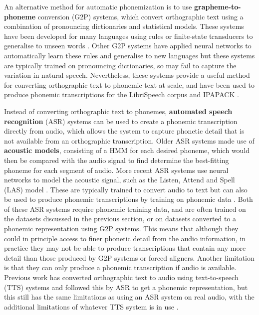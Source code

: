 An alternative method for automatic phonemization is to use \textbf{grapheme-to-phoneme} conversion (G2P) systems, which convert orthographic text using a combination of pronouncing dictionaries and statistical models. These systems have been developed for many languages using rules or finite-state transducers to generalise to unseen words \citep{Mortensen-et-al:2018, johnson2020g2p, Bernard2021}. Other G2P systems have applied neural networks to automatically learn these rules and generalise to new languages \citep{NOVAK_MINEMATSU_HIROSE_2016, Zhu2022} but these systems are typically trained on pronouncing dictionaries, so may fail to capture the variation in natural speech. Nevertheless, these systems provide a useful method for converting orthographic text to phonemic text at scale, and have been used to produce phonemic transcriptions for the LibriSpeech corpus \citep{Kahn_2020} and IPAPACK \citep{zhu-etal-2024-taste}.

Instead of converting orthographic text to phonemes, \textbf{automated speech recognition} (ASR) systems can be used to create a phonemic transcription directly from audio, which allows the system to capture phonetic detail that is not available from an orthographic transcription. Older ASR systems made use of \textbf{acoustic models}, consisting of a HMM for each desired phoneme, which would then be compared with the audio signal to find determine the best-fitting phoneme for each segment of audio. More recent ASR systems use neural networks to model the acoustic signal, such as the Listen, Attend and Spell (LAS) model \citep{chan2015listen}. These are typically trained to convert audio to text but can also be used to produce phonemic transcriptions by training on phonemic data \citep{feng-2023-language-universal-phonetic}. Both of these ASR systems require phonemic training data, and are often trained on the datasets discussed in the previous section, or on datasets converted to a phonemic representation using G2P systems. This means that although they could in principle access to finer phonetic detail from the audio information, in practice they may not be able to produce transcriptions that contain any more detail than those produced by G2P systems or forced aligners. Another limitation is that they can only produce a phonemic transcription if audio is available. Previous work has converted orthographic text to audio using text-to-speech (TTS) systems and followed this by ASR to get a phonemic representation, but this still has the same limitations as using an ASR system on real audio, with the additional limitations of whatever TTS system is in use .  

